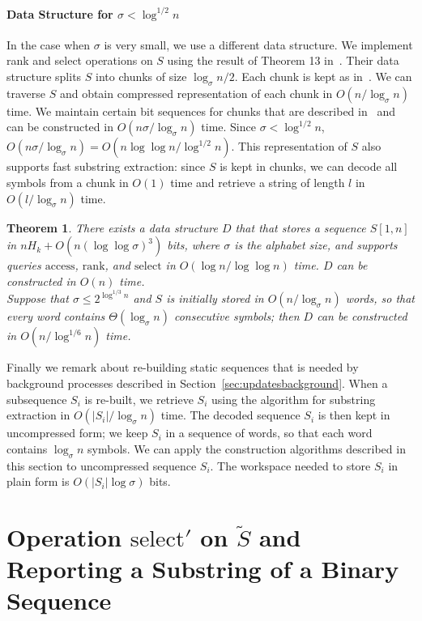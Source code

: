 \documentclass[11pt]{article}\usepackage{fullpage}
\def\idrm#1{\ensuremath{\mathrm{#1}}}
\newtheorem{theorem}{Theorem}
\newcommand{\tS}{{\tilde S}}
\newcommand{\ra}{\idrm{rank}}
\newcommand{\sel}{\idrm{select}}
\newcommand{\acc}{\idrm{access}}
\begin{document}
\paragraph{Data Structure for $\sigma< \log^{1/2} n$}
In the case when $\sigma$ is very small, we use a different data structure. 
We implement rank and select operations on $S$ using the result of Theorem 13 in~\cite{BN12}. Their data structure splits $S$ into chunks of size $\log_{\sigma}n/2$. Each chunk is kept as in~\cite{RRR07}. We can traverse $S$ and obtain compressed representation of each chunk in $O(n/\log_{\sigma}n)$ time. We maintain certain bit sequences for chunks that are described in~\cite{BN12} and can be constructed in $O(n\sigma/\log_{\sigma}n)$ time. Since $\sigma<\log^{1/2}n$, $O(n\sigma/\log_{\sigma}n)=O(n\log\log n/\log^{1/2}n)$. This representation of $S$ also supports fast substring extraction: since $S$ is kept in chunks, we can decode all symbols from a chunk in $O(1)$ time and retrieve a string of length $l$ in $O(l/\log_{\sigma}n)$ time. 

\begin{theorem}
  \label{theor:static}
There exists a data structure $D$  that that stores a sequence $S[1,n]$ in  $nH_k+O(n(\log\log\sigma)^3)$ bits, where $\sigma$ is the alphabet size,  and supports queries $\acc$, $\ra$, and $\sel$ in $O(\log n/\log\log n)$ time.  $D$ can be constructed in $O(n)$ time. \\
Suppose that $\sigma\le 2^{\log^{1/3}n}$ and $S$ is initially stored in $O(n/\log_{\sigma}n)$ words, so that every word contains $\Theta(\log_{\sigma}n)$ consecutive symbols; then $D$ can be constructed in $O(n/\log^{1/6}n)$ time.  
\end{theorem}
Finally we remark about re-building static sequences that is needed by background processes described in Section~\ref{sec:updatesbackground}. When a subsequence $S_i$ is re-built, we retrieve $S_i$ using the algorithm for substring extraction in $O(|S_i|/\log_{\sigma}n)$ time. The decoded sequence $S_i$ 
is then kept in uncompressed form; we keep $S_i$ in a sequence of words, so that each word contains $\log_{\sigma}n$ symbols. We can apply the construction algorithms described in this section to uncompressed sequence $S_i$. The workspace needed to store $S_i$ in plain form is $O(|S_i|\log \sigma)$ bits. 



\section{Operation $\sel'$ on $\tS$ and Reporting a Substring of a Binary Sequence}
\label{sec:appselprime}
\end{document}
